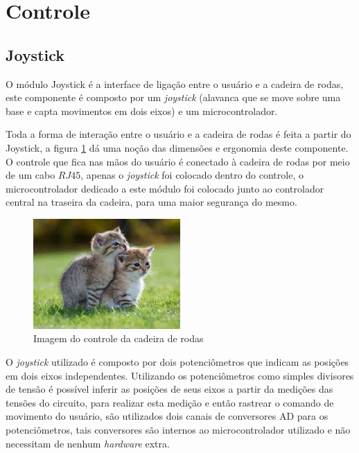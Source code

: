 \section{Controle}

\subsection{Joystick}

O módulo Joystick é a interface de ligação entre o usuário e a cadeira de rodas, este componente é composto por um \textit{joystick} (alavanca que se move sobre uma base e capta movimentos em dois eixos) e um microcontrolador.

Toda a forma de interação entre o usuário e a cadeira de rodas é feita a partir do Joystick, a figura \ref{fig:joy_hand_control} dá uma noção das dimensões e ergonomia deste componente. O controle que fica nas mãos do usuário é conectado à cadeira de rodas por meio de um cabo $RJ45$, apenas o \textit{joystick} foi colocado dentro do controle, o microcontrolador dedicado a este módulo foi colocado junto ao controlador central na traseira da cadeira, para uma maior segurança do mesmo.

\begin{figure}[!htb]
\centering
\includegraphics[width = 0.5\textwidth]{figuras/resultados/joy_hand_control}
\caption{Imagem do controle da cadeira de rodas}
\label{fig:joy_hand_control}
\end{figure}

O \textit{joystick} utilizado é composto por dois potenciômetros que indicam as posições em dois eixos independentes. Utilizando os potenciômetros como simples divisores de tensão é possível inferir as posições de seus eixos a partir da medições das tensões do circuito, para realizar esta medição e então rastrear o comando de movimento do usuário, são utilizados dois canais de conversores AD para os potenciômetros, tais conversores são internos ao microcontrolador utilizado e não necessitam de nenhum \textit{hardware} extra. 


